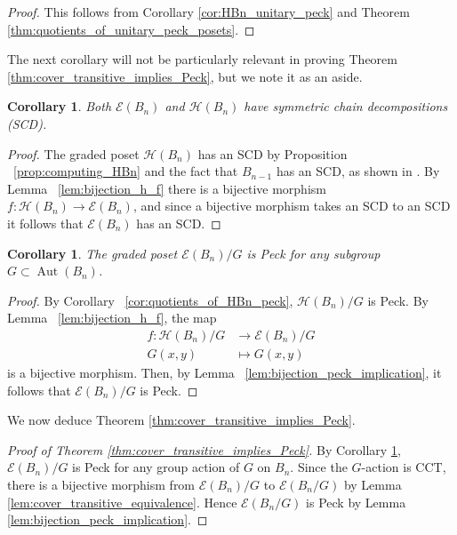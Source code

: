 \documentclass[smallextended, envcountsame, numbook]{svjour3}
\theoremstyle{plain}
\newtheorem{cor}[thm]{Corollary}
\theoremstyle{definition}
\theoremstyle{remark}
\numberwithin{equation}{section}
\newcommand\Aut{\operatorname{Aut}}
\begin{document}
\begin{proof}
This follows from Corollary \ref{cor:HBn_unitary_peck} and Theorem \ref{thm:quotients_of_unitary_peck_posets}.
\end{proof}

The next corollary will not be particularly relevant in proving Theorem \ref{thm:cover_transitive_implies_Peck}, but we note it as an aside.

\begin{cor}
Both $\mathcal{E}(B_n)$ and $\mathcal H(B_n)$ have symmetric chain decompositions (SCD).
\end{cor}


\begin{proof}
The graded poset
$\mathcal{H}(B_n)$ has an SCD by Proposition ~\ref{prop:computing_HBn} and the fact that $B_{n-1}$ has an SCD, as shown in \cite{greene}.  By Lemma ~\ref{lem:bijection_h_f} there is a bijective morphism $f\colon\mathcal{H}(B_n)\rightarrow\mathcal{E}(B_n)$, and since a bijective morphism takes an SCD to an SCD it follows that $\mathcal{E}(B_n)$ has an SCD.
\end{proof}


\begin{cor}
\label{cor:quotiented_edge_peck}
The graded poset $\mathcal E(B_n)/G$ is Peck for any subgroup $G\subset \Aut(B_n)$.
\end{cor}
\begin{proof}
By Corollary ~\ref{cor:quotients_of_HBn_peck}, $\mathcal H(B_n)/G$ is Peck. By Lemma ~\ref{lem:bijection_h_f}, the map 
\begin{align*}
f\colon\mathcal H(B_n)/G &\rightarrow \mathcal E(B_n)/G \\
G(x, y) &\mapsto G(x, y)
\end{align*}
 is a bijective morphism. Then, by Lemma ~\ref{lem:bijection_peck_implication}, it follows that $\mathcal E(B_n)/G$ is Peck.
\end{proof}

We now deduce Theorem \ref{thm:cover_transitive_implies_Peck}.

\begin{proof}[Proof of Theorem \ref{thm:cover_transitive_implies_Peck}]
By Corollary \ref{cor:quotiented_edge_peck}, $\mathcal{E}(B_n)/G$ is Peck for any group action of $G$ on $B_n$. Since the $G$-action is CCT, there is a bijective morphism from $\mathcal{E}(B_n)/G$ to $\mathcal{E}(B_n/G)$ by Lemma \ref{lem:cover_transitive_equivalence}. Hence $\mathcal{E}(B_n/G)$ is Peck by Lemma \ref{lem:bijection_peck_implication}.
\end{proof}
\end{document}
